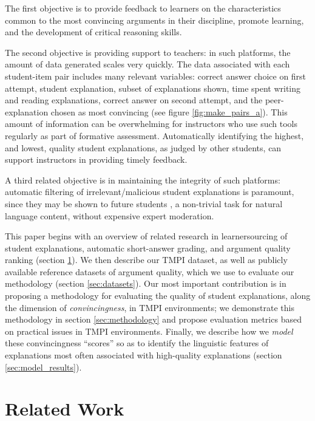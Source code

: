 \documentclass[notitlepage,12pt]{jedm}
\begin{document}
The first objective is to provide feedback to learners on the 
characteristics common to the most convincing arguments in their discipline, 
promote learning, and the development of critical reasoning skills.

The second objective is providing support to teachers: in such platforms, the 
amount of data generated scales very quickly.
The data associated with each student-item pair includes many relevant 
variables: correct answer choice on first attempt, student explanation, subset 
of explanations shown, time spent writing and reading explanations, correct 
answer on second attempt, and the peer-explanation chosen as most convincing 
(see figure \ref{fig:make_pairs_a}).   
This amount of information can be overwhelming for instructors who use such 
tools regularly as part of formative assessment. 
Automatically identifying the highest, and lowest, quality student 
explanations, as judged by other students, can support instructors in providing 
timely feedback. 

A third related objective is in maintaining the integrity of such platforms: 
automatic filtering of irrelevant/malicious student explanations is paramount, 
since they may be shown to future students \cite{gagnon_filtering_2019}, a 
non-trivial task for natural language content, without expensive expert 
moderation.

This paper begins with an overview of related research in learnersourcing of 
student explanations, automatic short-answer grading, and argument quality 
ranking (section \ref{sec:related_work}).
We then describe our TMPI dataset, as well as publicly available reference 
datasets of argument quality, which we use to evaluate our methodology (section 
\ref{sec:datasets}).
Our most important contribution is in proposing a methodology for evaluating 
the quality of student explanations, along the dimension of 
\textit{convincingness}, in TMPI environments; we demonstrate this methodology 
in section \ref{sec:methodology} and propose evaluation metrics based on 
practical issues in TMPI environments.
Finally, we describe how we \textit{model} these convincingness ``scores'' so 
as to identify the linguistic features of explanations most often associated 
with high-quality explanations (section \ref{sec:model_results}).


\section{Related Work}\label{sec:related_work}
\end{document}

